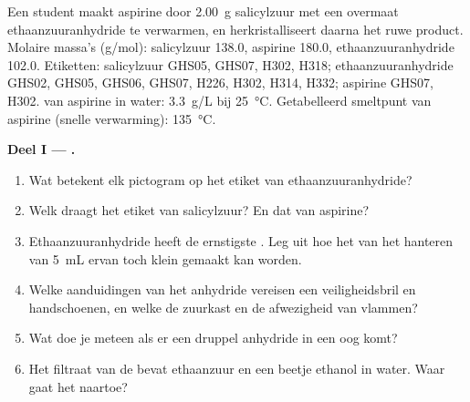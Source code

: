 \begin{problem}
\label{pb:b1:lab-techniques-1:1}
Een student maakt aspirine door \qty{2.00}{g} salicylzuur met een
overmaat ethaanzuuranhydride te verwarmen, en herkristalliseert daarna
het ruwe product. Molaire massa's (\unit{g/mol}): salicylzuur
 138.0, aspirine  180.0, ethaanzuuranhydride
 102.0. Etiketten: salicylzuur GHS05, GHS07, H302, H318;
ethaanzuuranhydride GHS02, GHS05, GHS06, GHS07, H226, H302, H314, H332;
aspirine GHS07, H302.  van aspirine in water:
\qty{3.3}{g/L} bij \qty{25}{\celsius}. Getabelleerd smeltpunt van
aspirine (snelle verwarming): \qty{135}{\celsius}.

\medskip
\noindent\textbf{Deel I --- .}
\begin{enumerate}
  \item Wat betekent elk pictogram op het etiket van ethaanzuuranhydride?
  \item Welk  draagt het etiket van salicylzuur? En dat van
        aspirine?
  \item Ethaanzuuranhydride heeft de ernstigste . Leg uit hoe het
         van het hanteren van \qty{5}{mL} ervan toch klein gemaakt
        kan worden.
  \item Welke aanduidingen van het anhydride vereisen een veiligheidsbril
        en handschoenen, en welke de zuurkast en de afwezigheid van
        vlammen?
  \item Wat doe je meteen als er een druppel anhydride in een oog komt?
  \item Het filtraat van de  bevat ethaanzuur en een
        beetje ethanol in water. Waar gaat het naartoe?
\end{enumerate}


\end{problem}
